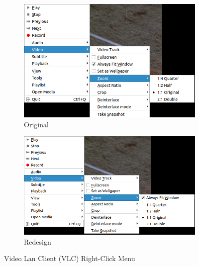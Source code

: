 \documentclass[a4paper,11pt,oneside]{scrreprt}
\begin{document}
\begin{figure}[H]
	\centering
	\begin{subfigure}{.5\textwidth}
		\centering
		\includegraphics[clip, trim=0cm 0cm 0cm 0cm, scale=0.35]{./images/vlc_original.png}
		\caption{Original}
		\label{fig:sub1}
	\end{subfigure}%
	\begin{subfigure}{.5\textwidth}
		\centering
		\includegraphics[clip, trim=0cm 0cm 0cm 0cm, scale=0.50]{./images/vlc_redesign.png}
		\caption{Redesign}
		\label{fig:sub2}
	\end{subfigure}
	\caption{Video Lan Client (VLC) Right-Click Menu}
	\label{fig:test}
\end{figure}
\end{document}
